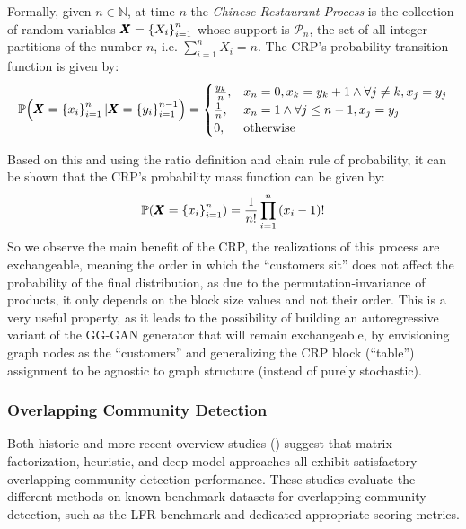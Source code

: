 \begin{definition}
    Formally, given $n \in \mathbb{N}$, at time $n$ the \emph{Chinese Restaurant Process} is the collection of random variables $\pmb{X}=\mathopen{}\left\{X_i\right\}_{i=1}^{n}$ whose support is $\mathcal{P}_n$, the set of all integer partitions of the number $n$, i.e. $\sum_{i=1}^{n}{X_i}=n$. The CRP's probability transition function is given by: 
\begin{equation}
\mathbb{P}\mathopen{}\left(\pmb{X}=\mathopen{}\left\{x_i\right\}_{i=1}^{n} \vert \pmb{X}=\mathopen{}\left\{y_i\right\}_{i=1}^{n-1}\right)
= \begin{cases} 
\frac{y_k}{n}, & x_n=0, x_k = y_k+1 \wedge \forall j \neq k, x_j=y_j \\
\frac{1}{n}, & x_n = 1 \wedge \forall j \leq n-1, x_j=y_j \\
0, & \text{otherwise} \end{cases}
\end{equation}
\end{definition}

Based on this and using the ratio definition and chain rule of probability, it can be shown that the CRP's probability mass function can be given by: 
\begin{equation}
\mathbb{P}\mathopen{}\left(\pmb{X}=\mathopen{}\left\{x_i\right\}_{i=1}^{n}\right) = \frac{1}{n!}\prod_{i=1}^{n}{\mathopen{}\left(x_i - 1\right)!}
\end{equation}
So we observe the main benefit of the CRP, the realizations of this process are exchangeable, meaning the order in which the \enquote{customers sit} does not affect the probability of the final distribution, as due to the permutation-invariance of products, it only depends on the block size values and not their order. This is a very useful property, as it leads to the possibility of building an autoregressive variant of the GG-GAN generator that will remain exchangeable, by envisioning graph nodes as the \enquote{customers} and generalizing the CRP block (\enquote{table}) assignment to be agnostic to graph structure (instead of purely stochastic).

\subsubsection{Overlapping Community Detection}
Both historic and more recent overview studies (\cite{xie_overlapping_2013, li_deeper_2018, liu_deep_2020, vieira_comparative_2020}) suggest that matrix factorization, heuristic, and deep model approaches all exhibit satisfactory overlapping community detection performance. These studies evaluate the different methods on known benchmark datasets for overlapping community detection, such as the LFR benchmark \cite{lancichinetti_benchmarks_2009} and dedicated appropriate scoring metrics.

